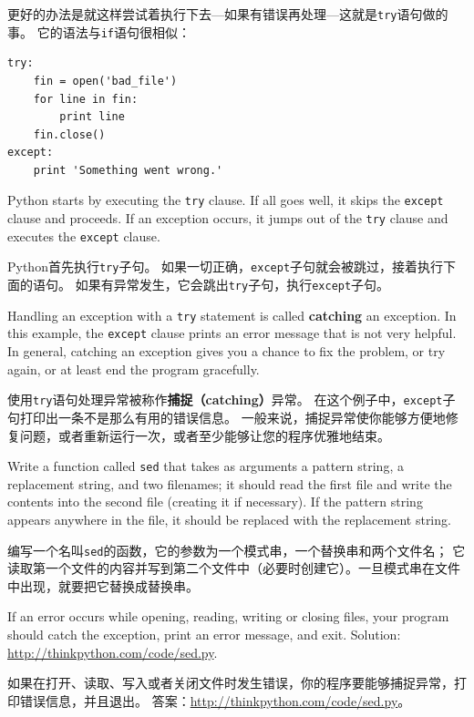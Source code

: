 \documentclass[10pt]{book}
\begin{document}
\begin{CJK}{UTF8}{gbsn}
更好的办法是就这样尝试着执行下去---如果有错误再处理---这就是{\tt try}语句做的事。
它的语法与{\tt if}语句很相似：

\begin{verbatim}
try:    
    fin = open('bad_file')
    for line in fin:
        print line
    fin.close()
except:
    print 'Something went wrong.'
\end{verbatim}
%
Python starts by executing the {\tt try} clause.  If all goes
well, it skips the {\tt except} clause and proceeds.  If an
exception occurs, it jumps out of the {\tt try} clause and
executes the {\tt except} clause.

Python首先执行{\tt try}子句。
如果一切正确，{\tt except}子句就会被跳过，接着执行下面的语句。
如果有异常发生，它会跳出{\tt try}子句，执行{\tt except}子句。

Handling an exception with a {\tt try} statement is called {\bf
catching} an exception.  In this example, the {\tt except} clause
prints an error message that is not very helpful.  In general,
catching an exception gives you a chance to fix the problem, or try
again, or at least end the program gracefully.

使用{\tt try}语句处理异常被称作{\bf 捕捉（catching）}异常。
在这个例子中，{\tt except}子句打印出一条不是那么有用的错误信息。
一般来说，捕捉异常使你能够方便地修复问题，或者重新运行一次，或者至少能够让您的程序优雅地结束。

\begin{exercise}

Write a function called {\tt sed} that takes as arguments a pattern string,
a replacement string, and two filenames; it should read the first file
and write the contents into the second file (creating it if
necessary).  If the pattern string appears anywhere in the file, it
should be replaced with the replacement string.

编写一个名叫{\tt sed}的函数，它的参数为一个模式串，一个替换串和两个文件名；
它读取第一个文件的内容并写到第二个文件中（必要时创建它）。一旦模式串在文件中出现，就要把它替换成替换串。

If an error occurs while opening, reading, writing or closing files,
your program should catch the exception, print an error message, and
exit.  Solution: \url{http://thinkpython.com/code/sed.py}.

如果在打开、读取、写入或者关闭文件时发生错误，你的程序要能够捕捉异常，打印错误信息，并且退出。
答案：\url{http://thinkpython.com/code/sed.py}。


\end{exercise}



\end{CJK}
\end{document}
